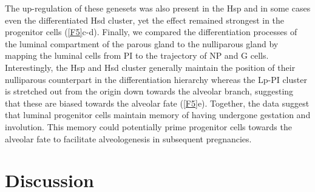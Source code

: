 \documentclass[titlepage, 12pt, oneside]{amsart}
\begin{document}
The up-regulation of these genesets was also present in the Hsp and in some cases even the differentiated Hsd cluster, yet the effect remained strongest in the progenitor cells (\autoref{F5}c-d).
Finally, we compared the differentiation processes of the luminal compartment of the parous gland to the nulliparous gland by mapping the luminal cells from PI to the trajectory of NP and G cells.
Interestingly, the Hsp and Hsd cluster generally maintain the position of their nulliparous counterpart in the differentiation hierarchy whereas the Lp-PI cluster is stretched out from the origin down towards the alveolar branch, suggesting that these are biased towards the alveolar fate (\autoref{F5}e).
Together, the data suggest that luminal progenitor cells maintain memory of having undergone gestation and involution.
This memory could potentially prime progenitor cells towards the alveolar fate to facilitate alveologenesis in subsequent pregnancies.

\section{Discussion}
\end{document}
